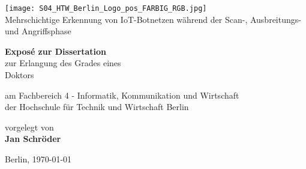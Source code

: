 \documentclass[
    a4paper,
    pagesize,
	pdftex,
    12pt,
]{scrartcl}
\begin{document}
\begin{titlepage}
    \begin{center}
        
        \texttt{[image: S04\_HTW\_Berlin\_Logo\_pos\_FARBIG\_RGB.jpg]} \\
        \vspace{1.0cm}
         Mehrschichtige Erkennung von IoT-Botnetzen während der Scan-, Ausbreitungs- und Angriffsphase
             
        \vspace{1.5cm}
 
        \textbf{Exposé zur Dissertation} \\    
        zur Erlangung des Grades eines\\
        Doktors

        \vspace{1.5cm}
        am Fachbereich 4 - Informatik, Kommunikation und Wirtschaft\\
        der Hochschule für Technik und Wirtschaft Berlin\\
        
        \vspace{1.5cm}

        vorgelegt von \\
        \textbf{Jan Schröder}
      
        \vspace{1.5cm}    
        Berlin, \today\\
        
             
    \end{center}
\end{titlepage}


\tableofcontents
\newpage



\newpage

\newpage

\newpage

\newpage

\newpage

\newpage

\newpage

\newpage



\end{document}
